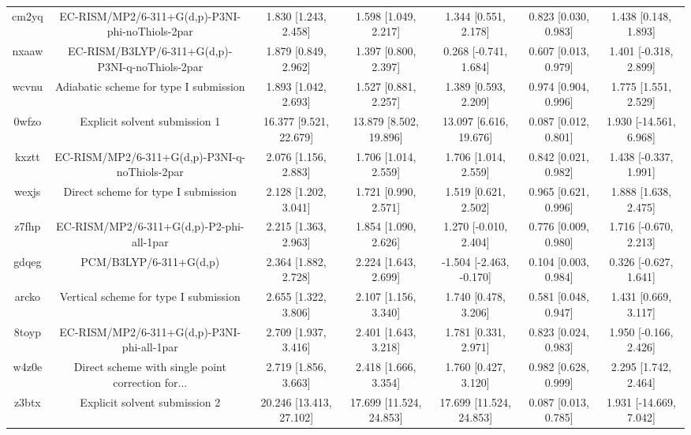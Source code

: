 \documentclass{article}
\begin{document}
\begin{center}
\begin{longtable}{|ccccccc|}
 cm2yq &    EC-RISM/MP2/6-311+G(d,p)-P3NI-phi-noThiols-2par &     1.830 [1.243, 2.458] &     1.598 [1.049, 2.217] &     1.344 [0.551, 2.178] &  0.823 [0.030, 0.983] &    1.438 [0.148, 1.893] \\
 nxaaw &    EC-RISM/B3LYP/6-311+G(d,p)-P3NI-q-noThiols-2par &     1.879 [0.849, 2.962] &     1.397 [0.800, 2.397] &    0.268 [-0.741, 1.684] &  0.607 [0.013, 0.979] &   1.401 [-0.318, 2.899] \\
 wcvnu &             Adiabatic scheme for type I submission &     1.893 [1.042, 2.693] &     1.527 [0.881, 2.257] &     1.389 [0.593, 2.209] &  0.974 [0.904, 0.996] &    1.775 [1.551, 2.529] \\
 0wfzo &                      Explicit solvent submission 1 &   16.377 [9.521, 22.679] &   13.879 [8.502, 19.896] &   13.097 [6.616, 19.676] &  0.087 [0.012, 0.801] &  1.930 [-14.561, 6.968] \\
 kxztt &      EC-RISM/MP2/6-311+G(d,p)-P3NI-q-noThiols-2par &     2.076 [1.156, 2.883] &     1.706 [1.014, 2.559] &     1.706 [1.014, 2.559] &  0.842 [0.021, 0.982] &   1.438 [-0.337, 1.991] \\
 wexjs &                Direct scheme for type I submission &     2.128 [1.202, 3.041] &     1.721 [0.990, 2.571] &     1.519 [0.621, 2.502] &  0.965 [0.621, 0.996] &    1.888 [1.638, 2.475] \\
 z7fhp &           EC-RISM/MP2/6-311+G(d,p)-P2-phi-all-1par &     2.215 [1.363, 2.963] &     1.854 [1.090, 2.626] &    1.270 [-0.010, 2.404] &  0.776 [0.009, 0.980] &   1.716 [-0.670, 2.213] \\
 gdqeg &                             PCM/B3LYP/6-311+G(d,p) &     2.364 [1.882, 2.728] &     2.224 [1.643, 2.699] &  -1.504 [-2.463, -0.170] &  0.104 [0.003, 0.984] &   0.326 [-0.627, 1.641] \\
 arcko &              Vertical scheme for type I submission &     2.655 [1.322, 3.806] &     2.107 [1.156, 3.340] &     1.740 [0.478, 3.206] &  0.581 [0.048, 0.947] &    1.431 [0.669, 3.117] \\
 8toyp &         EC-RISM/MP2/6-311+G(d,p)-P3NI-phi-all-1par &     2.709 [1.937, 3.416] &     2.401 [1.643, 3.218] &     1.781 [0.331, 2.971] &  0.823 [0.024, 0.983] &   1.950 [-0.166, 2.426] \\
 w4z0e &  Direct scheme with single point correction for... &     2.719 [1.856, 3.663] &     2.418 [1.666, 3.354] &     1.760 [0.427, 3.120] &  0.982 [0.628, 0.999] &    2.295 [1.742, 2.464] \\
 z3btx &                      Explicit solvent submission 2 &  20.246 [13.413, 27.102] &  17.699 [11.524, 24.853] &  17.699 [11.524, 24.853] &  0.087 [0.013, 0.785] &  1.931 [-14.669, 7.042] \\

\end{longtable}
\end{center}
\end{document}
